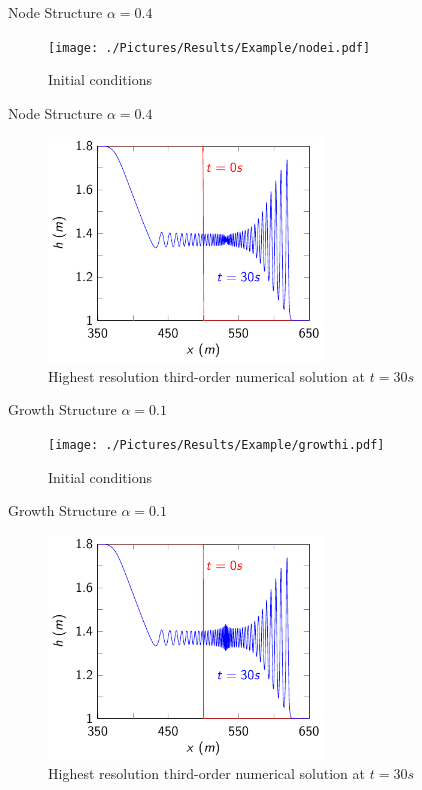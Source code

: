 \documentclass[pdf]{beamer}
\begin{document}
\begin{frame}{Node Structure $\alpha = 0.4$}
	\begin{figure}
		\texttt{[image: ./Pictures/Results/Example/nodei.pdf]}
		\caption{Initial conditions}
	\end{figure}
\end{frame}

\begin{frame}{Node Structure $\alpha = 0.4$}
	\begin{figure}
		\includegraphics[width=0.65\textwidth]{./Pictures/Results/Example/node.pdf}
		\caption{Highest resolution third-order numerical solution at $t=30s$}
	\end{figure}
\end{frame}

\begin{frame}{Growth Structure $\alpha = 0.1$}
	\begin{figure}
		\texttt{[image: ./Pictures/Results/Example/growthi.pdf]}
		\caption{Initial conditions}
	\end{figure}
\end{frame}

\begin{frame}{Growth Structure $\alpha = 0.1$}
	\begin{figure}
		\includegraphics[width=0.65\textwidth]{./Pictures/Results/Example/growth.pdf}
		\caption{Highest resolution third-order numerical solution at $t=30s$}
	\end{figure}
\end{frame}
\end{document}

